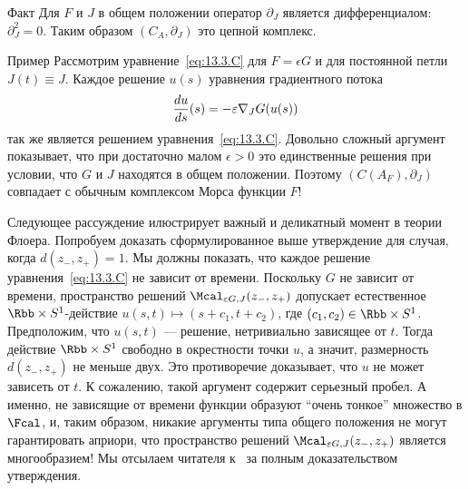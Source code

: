 \begin{thm}{Факт}\label{13.3.F}
  Для $F$ и $J$ в общем положении оператор $\partial_{J}$ является
  дифференциалом: $\partial_{J}^{2}=0$.
  Таким образом $(C_{A},\partial_{J})$ это цепной комплекс.
\end{thm}

\begin{thm}{Пример}\label{13.3.G}
  Рассмотрим уравнение~\ref{eq:13.3.C} для $F = \epsilon G$ и для
  постоянной петли $J(t)\equiv J$.
  Каждое решение $u(s)$ уравнения градиентного потока
  \[
  \frac{d u}{d s} (s) = -\varepsilon\nabla_{J} G(u(s))
  \]
  так же является решением уравнения~\ref{eq:13.3.C}.
  Довольно сложный аргумент \cite[Lemma 7.1]{HS} показывает, что при
  достаточно малом $\epsilon>0$ это единственные решения при
  условии, что $G$ и $J$ находятся в общем положении.
  Поэтому $(C(A_{F}),\partial_{J})$ совпадает с обычным комплексом
  Морса функции $F$!
\end{thm}

Следующее рассуждение илюстрирует важный и деликатный
момент в теории Флоера.
Попробуем доказать сформулированное выше утверждение для случая, когда
$d(z_{-}, z_{+})=1$.  
Мы должны показать, что каждое решение уравнения~\ref{eq:13.3.C} не
зависит от времени.
Поскольку $G$ не зависит от времени, пространство решений
$\Mcal_{\epsilon G,J}(z_{-},z_{+})$ допускает естественное $\Rbb\times
S^{1}$-действие $u(s, t) \mapsto (s+c_{1},t+c_{2})$, где
$(c_{1},c_{2})\in\Rbb\times S^{1}$.
Предположим, что $u(s, t)$ --- решение, нетривиально зависящее от $t$.
Тогда действие $\Rbb\times S^{1}$ свободно в окрестности точки $u$,
а значит, размерность $d(z_{-}, z_{+})$ не меньше двух.
Это противоречие доказывает, что $u$ не может зависеть от $t$.
К сожалению, такой аргумент содержит серьезный пробел.
А именно, не зависящие от времени функции образуют ``очень тонкое''
множество в $\Fcal$, и, таким образом, никакие аргументы типа общего
положения не могут гарантировать априори, что пространство решений
$\Mcal_{\epsilon G,J}(z_{-}, z_{+})$ является многообразием!
Мы отсылаем читателя к~\cite{HS} за полным доказательством утверждения.

